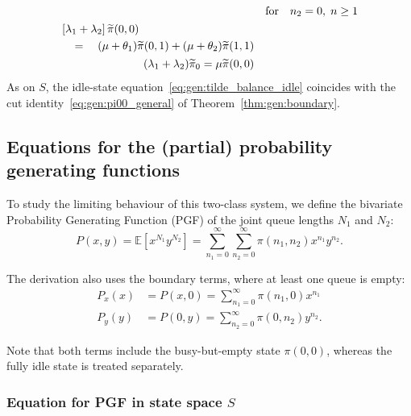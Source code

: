 \begin{align}
\begin{split}
    \end{split}
    && \text{for} \quad n_2=0, \; n \geq 1 \label{eq:gen:tilde_balance_y_boundary} \\
    \begin{split}
        & \left[ \lambda_1 + \lambda_2 \right] \widetilde{\pi}(0,0) \\
        & \quad = \quad (\mu + \theta_1) \widetilde{\pi}(0,1) + (\mu + \theta_2) \widetilde{\pi}(1,1)
    \end{split}
    && \label{eq:gen:tilde_balance_zero} \\
    \begin{split}
        (\lambda_1+\lambda_2) \widetilde{\pi}_0 = \mu \widetilde{\pi}(0,0)
    \end{split}
    && \label{eq:gen:tilde_balance_idle}
\end{align}
As on $S$, the idle-state equation~\eqref{eq:gen:tilde_balance_idle} coincides with the cut identity~\eqref{eq:gen:pi00_general} of Theorem~\ref{thm:gen:boundary}.


\subsection{Equations for the (partial) probability generating functions} \label{ssec:pgf_derivation}

To study the limiting behaviour of this two-class system, we define the bivariate Probability Generating Function (PGF) of the joint queue lengths $N_1$ and $N_2$:
\begin{equation*}
    P(x,y) = \mathbb{E}[x^{N_1} y^{N_2}] = \sum_{n_1=0}^{\infty} \sum_{n_2=0}^{\infty} \pi(n_1,n_2) x^{n_1} y^{n_2}.
\end{equation*}

The derivation also uses the boundary terms, where at least one queue is empty:
\begin{align*}
    P_x(x) &= P(x,0) = \sum_{n_1=0}^{\infty} \pi(n_1,0) x^{n_1} \\
    P_y(y) &= P(0,y) = \sum_{n_2=0}^{\infty} \pi(0,n_2) y^{n_2}.
\end{align*}

Note that both terms include the busy-but-empty state $\pi(0,0)$, whereas the fully idle state is treated separately.

\subsubsection{Equation for PGF in state space \texorpdfstring{$S$}{S}}

